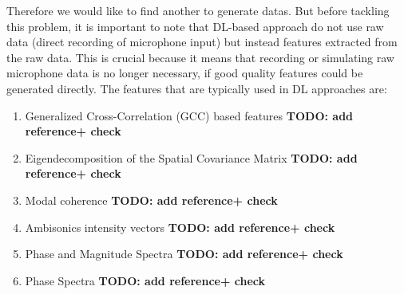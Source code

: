 \documentclass{article}
\begin{document}
Therefore we would like to find another to generate datas. But before tackling this problem, it is important to note that DL-based approach do not use raw data (direct recording of microphone input) but instead features extracted from the raw data. This is crucial because it means that recording or simulating raw microphone data is no longer necessary, if good quality features could be generated directly. The features that are typically used in DL approaches are:

\begin{enumerate}
    \item Generalized Cross-Correlation (GCC) based features \textbf{TODO: add reference+ check}
    \item Eigendecomposition of the Spatial Covariance Matrix \textbf{TODO: add reference+ check}
    \item Modal coherence \textbf{TODO: add reference+ check}
    \item Ambisonics intensity vectors \textbf{TODO: add reference+ check}
    \item Phase and Magnitude Spectra \textbf{TODO: add reference+ check}
    \item Phase Spectra \textbf{TODO: add reference+ check}
\end{enumerate}

%

 
\end{document}
